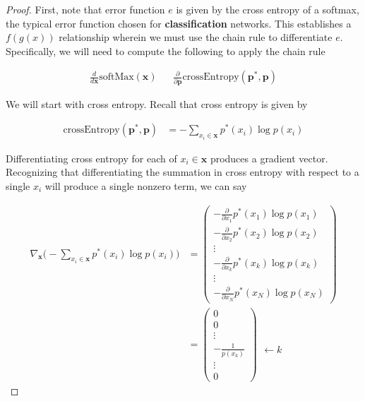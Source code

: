 \documentclass[11pt]{article}
\newcommand{\pd}{\partial}
\newcommand{\bs}{\boldsymbol}
\begin{document}
\begin{proof}
	First, note that error function $e$ is given by the cross entropy of a
	softmax, the typical error function chosen for \textbf{classification}
	networks. This establishes a $f(g(x))$ relationship wherein we must use the
	chain rule to differentiate $e$. Specifically, we will need to compute the
	following to apply the chain rule

	\begin{align}
		\frac{d}{d \bs{x}} \text{softMax}(\bs{x})
		&&
		\frac{\pd}{\pd \bs{p}} \text{crossEntropy}(\bs{p}^*, \bs{p})
	\end{align}

	We will start with cross entropy. Recall that cross entropy is given by

	\begin{align}
		\text{crossEntropy}(\boldsymbol{p}^*, \boldsymbol{p})
		&=
		-\sum_{x_i\in\boldsymbol{x}} p^*(x_i) \log p(x_i)
	\end{align}

	Differentiating cross entropy for each of $x_i \in \bs{x}$ produces a
	gradient vector. Recognizing that differentiating the summation in cross
	entropy with respect to a single $x_i$ will produce a single nonzero term,
	we can say

	\begin{align}
		\nabla_{\bs{x}}\bigg(-\sum_{x_i\in\bs{x}} p^*(x_i) \log p(x_i)\bigg)
 		&=
		\begin{pmatrix}
			-\frac{\pd}{\pd x_1} p^*(x_1) \log p(x_1)\\
			-\frac{\pd}{\pd x_2} p^*(x_2) \log p(x_2)\\
			\vdots \\
			-\frac{\pd}{\pd x_k} p^*(x_k) \log p(x_k)\\
			\vdots \\
			-\frac{\pd}{\pd x_N} p^*(x_N) \log p(x_N)
		\end{pmatrix}
		\\ &=
		\begin{pmatrix}
			0 \\
			0 \\
			\vdots \\
			-\frac{1}{p(x_k)} \\
			\vdots \\
			0
		\end{pmatrix}
		\begin{matrix}
			\phantom{0} \\
			\phantom{0} \\
			\phantom{\vdots} \\
			\leftarrow k \phantom{\frac{1}{1}} \\
			\phantom{\vdots} \\
			\phantom{0}
		\end{matrix}
	\end{align}


\end{proof}
\end{document}
